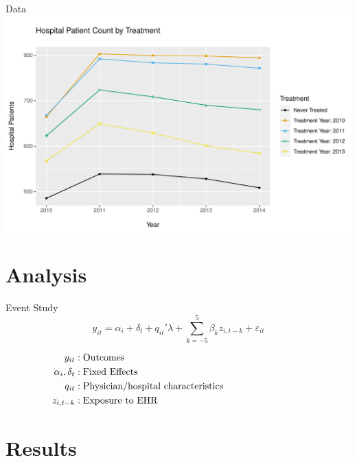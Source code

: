 \documentclass[10pt]{beamer}
\begin{document}
\begin{frame}{Data}
\centering
    \includegraphics[scale=.5]{Objects/cont_treatment_graph.pdf}
    
\end{frame}


\section{Analysis}


\begin{frame}{Event Study}
\begin{equation*}
    y_{it}=\alpha_i+\delta_t+q_{it}'\lambda+\sum_{k=-5}^5 \beta_kz_{i,t-k} + \varepsilon_{it}
\end{equation*}

\vspace{4mm}

\begin{align*}
    y_{it} &: \text{Outcomes} \hspace{30mm}\\
    \alpha_i, \delta_t &: \text{Fixed Effects}\hspace{30mm}\\
    q_{it} &: \text{Physician/hospital characteristics}\hspace{30mm}\\
    z_{i,t-k} &: \text{Exposure to EHR} \hspace{30mm}
\end{align*}

    
\end{frame}

\section{Results}
\end{document}
